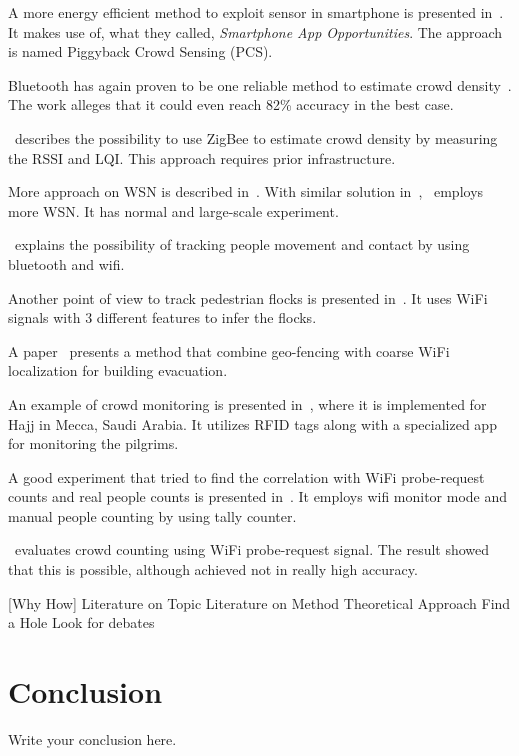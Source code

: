 \documentclass{article}
\begin{document}
A more energy efficient method to exploit sensor in smartphone is presented in~\cite{thesis040}. It makes use of, what they called, \textit{Smartphone App Opportunities}. The approach is named Piggyback Crowd Sensing (PCS).

Bluetooth has again proven to be one reliable method to estimate crowd density~\cite{thesis041}. The work alleges that it could even reach 82\% accuracy in the best case.

\cite{thesis042}~describes the possibility to use ZigBee to estimate crowd density by measuring the RSSI and LQI. This approach requires prior infrastructure.

More approach on WSN is described in~\cite{thesis043}. With similar solution in~\cite{thesis042},~\cite{thesis043} employs more WSN. It has normal and large-scale experiment.

\cite{thesis022}~explains the possibility of tracking people movement and contact by using bluetooth and wifi.

Another point of view to track pedestrian flocks is presented in~\cite{thesis033}. It uses WiFi signals with 3 different features to infer the flocks.

A paper~\cite{thesis045} presents a method that combine geo-fencing with coarse WiFi localization for building evacuation.

An example of crowd monitoring is presented in~\cite{thesis050}, where it is implemented for Hajj in Mecca, Saudi Arabia. It utilizes RFID tags along with a specialized app for monitoring the pilgrims.

A good experiment that tried to find the correlation with WiFi probe-request counts and real people counts is presented in~\cite{thesis047}. It employs wifi monitor mode and manual people counting by using tally counter.

\cite{thesis057}~evaluates crowd counting using WiFi probe-request signal. The result showed that this is possible, although achieved not in really high accuracy.

[Why How]
Literature on Topic
Literature on Method
Theoretical Approach
Find a Hole
Look for debates

\section{Conclusion}
Write your conclusion here.

{}

\end{document}
